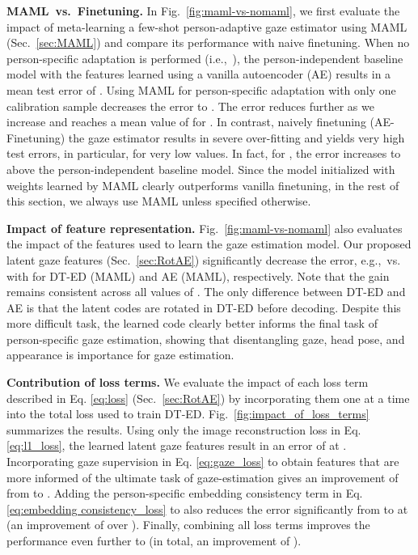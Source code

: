 \documentclass[10pt,twocolumn,letterpaper]{article}
\newcommand{\Paragraph}[1]
{\vspace{1.5mm} \noindent \textbf{#1}}
\def\ie{i.e.,~}
\def\eg{e.g.,~}
\begin{document}
\Paragraph{MAML~vs.~Finetuning.} In  Fig.~\ref{fig:maml-vs-nomaml}, we first evaluate the impact of meta-learning a few-shot person-adaptive gaze estimator using MAML (Sec.~\ref{sec:MAML}) and compare its performance with naive finetuning. When no person-specific adaptation is performed (\ie ), the person-independent baseline model  with the features learned using a vanilla autoencoder (AE) 
results in a mean test error of . Using MAML for person-specific adaptation with only one calibration sample decreases the error to . The error reduces further as we increase  and reaches a mean value of  for . 
In contrast, naively finetuning (AE-Finetuning) the gaze estimator results in severe over-fitting and yields very high test errors, in particular, for very low  values. In fact, for , the error increases to above the person-independent baseline model. Since the model initialized with weights learned by MAML clearly outperforms vanilla finetuning, in the rest of this section, we always use MAML unless specified otherwise.

\Paragraph{Impact of feature representation.} Fig.~\ref{fig:maml-vs-nomaml} also evaluates the impact of the features used to learn the gaze estimation model. Our proposed latent gaze features (Sec.~\ref{sec:RotAE}) significantly decrease the error, \eg  vs.  with  for DT-ED (MAML) and AE (MAML), respectively. Note that the gain remains consistent across all values of . 
The only difference between DT-ED and AE is that the latent codes are rotated in DT-ED before decoding.
Despite this more difficult task, the learned code clearly better informs the final task of person-specific gaze estimation, showing that disentangling gaze, head pose, and appearance is importance for gaze estimation.


\Paragraph{Contribution of loss terms.} We evaluate the impact of each loss term described in Eq. \eqref{eq:loss} (Sec.~\ref{sec:RotAE}) by incorporating them one at a time into the total loss used to train DT-ED. Fig.~\ref{fig:impact_of_loss_terms} summarizes the results. Using only the image reconstruction loss  in Eq. \eqref{eq:l1_loss}, the learned latent gaze features result in an error of  at . Incorporating gaze supervision  in Eq. \eqref{eq:gaze_loss} to obtain features that are more informed of the ultimate task of gaze-estimation gives an improvement of  from  to . Adding the person-specific embedding consistency term   in Eq. \eqref{eq:embedding consistency_loss} to  also reduces the error significantly from  to  at  (an improvement of over ). 
Finally, combining all loss terms improves the performance even further
to  (in total, an improvement of ).
\end{document}
